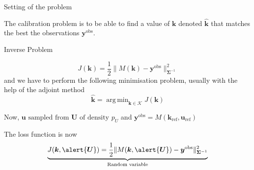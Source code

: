 \documentclass{beamer}
\newlength{\thirdcolwid}
\DeclareMathOperator*{\argmin}{arg\,min}
\newcommand{\yobs}{\bm{y}^{\mathrm{obs}}}
\newcommand{\kest}{\hat{\bm{k}}}
\begin{document}
\begin{frame}[t]
\begin{columns}[t]
\begin{column}{\thirdcolwid}
  \begin{block}{Setting of the problem}
    \begin{figure}[!h]
      \centering
      \resizebox{\linewidth}{!}{}
    \end{figure}
The calibration problem is to be able to find a value of $\bm{k}$ denoted $\kest$ that matches the best the observations $\yobs$. 
    
  \end{block}
\begin{block}{Inverse Problem}
\begin{figure}[!h]
  \centering
  {}
\end{figure}
    
% 
    \begin{equation*}
      \tag{Cost function}
  J(\bm{k}) = \frac12 \|M(\bm{k}) - \yobs \|_{\bm\Sigma^{-1}}^2 
\end{equation*}
and we have to perform the following minimisation problem, usually with the help of the adjoint method
\begin{equation*}
  \kest = \argmin_{\bm{k}\in\mathcal{K}} J(\bm{k})
\end{equation*}

Now, $\bm{u} \text{ sampled from } \bm{U} \text{ of density } p_U$
and $\yobs = M(\bm{k}_{\mathrm{ref}}, \bm{u}_{\mathrm{ref}})$



The loss function is now
\begin{equation*}
  \underbrace{J(\bm{k},\alert{\bm{U}}) = \frac12 \|M(\bm{k},\alert{\bm{U}}) - \yobs \|_{\bm\Sigma^{-1}}^2}_{\text{Random variable}}
\end{equation*}


\end{block}
\end{column}
\end{columns}
\end{frame}
\end{document}
